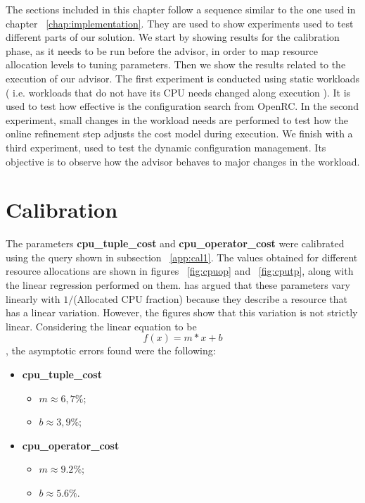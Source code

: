 The sections included in this chapter follow a sequence similar to the one used in chapter ~\ref{chap:implementation}. They are used to show experiments used to test different parts of our solution. We start by showing results for the calibration phase, as it needs to be run before the advisor, in order to map resource allocation levels to tuning parameters. Then we show the results related to the execution of our advisor. The first experiment is conducted using static workloads ( i.e. workloads that do not have its CPU needs changed along execution ). It is used to test how effective is the configuration search from OpenRC. In the second experiment, small changes in the workload needs are performed to test how the online refinement step adjusts the cost model during execution. We finish with a third experiment, used to test the dynamic configuration management. Its objective is to observe how the advisor behaves to major changes in the workload.


\section{Calibration}

The parameters \textbf{cpu\_tuple\_cost} and \textbf{cpu\_operator\_cost} were calibrated using the query shown in subsection ~\ref{app:cal1}. The values obtained for different resource allocations are shown in figures ~\ref{fig:cpuop} and ~\ref{fig:cputp}, along with the linear regression performed on them. \cite{Soror:2008:AVM:1376616.1376711} has argued that these parameters vary linearly with $1/$(Allocated CPU fraction) because they describe a resource that has a linear variation. However, the figures show that this variation is not strictly linear. Considering the linear equation to be
\[
 f(x) = m*x + b
\],
the asymptotic errors found were the following:
\begin{itemize}
 \item \textbf{cpu\_tuple\_cost}
 \begin{itemize}
  \item $m \approx 6,7\% $;
  \item $b \approx 3,9\% $;
 \end{itemize}
  \item \textbf{cpu\_operator\_cost}
 \begin{itemize}
  \item $m \approx 9.2\% $;
  \item $b \approx 5.6\% $.
 \end{itemize}
\end{itemize}

